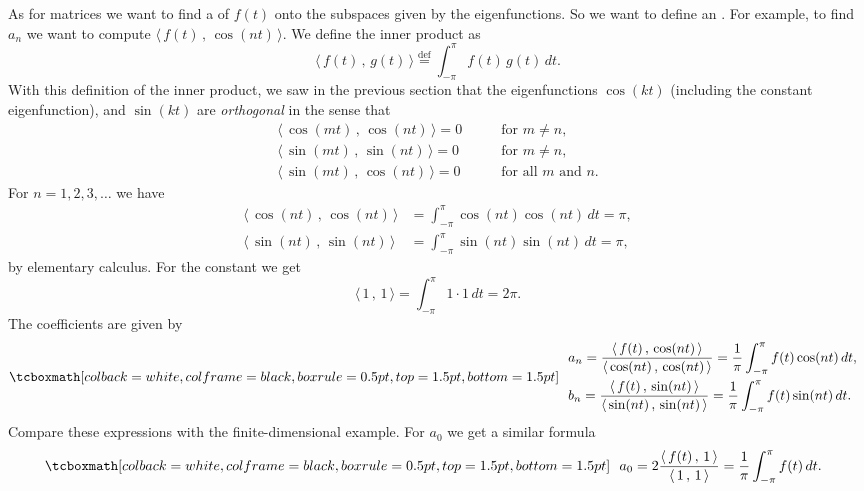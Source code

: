 As for matrices we want to find a \emph{}
of $f(t)$ onto the subspaces given by the eigenfunctions.  So we want to
define an \emph{}.  For example, to
find $a_n$ we want to compute $\langle \, f(t) \, , \, \cos (nt) \, \rangle$.
We define the inner product as
\begin{equation*}
\langle \, f(t)\, , \, g(t) \, \rangle \overset{\text{def}}{=}
\int_{-\pi}^\pi f(t) \, g(t) \, dt .
\end{equation*}
With this definition of the inner product,
we saw in the previous section that the eigenfunctions $\cos (kt)$
(including the constant eigenfunction), and
$\sin (kt)$ are \emph{orthogonal} in the sense
that
\begin{align*}
\langle \, \cos (mt)\, , \, \cos (nt) \, \rangle = 0 & \qquad \text{for } m \not= n , \\
\langle \, \sin (mt)\, , \, \sin (nt) \, \rangle = 0 & \qquad \text{for } m \not= n , \\
\langle \, \sin (mt)\, , \, \cos (nt) \, \rangle = 0 & \qquad \text{for all } m \text{ and } n .
\end{align*}
For $n=1,2,3,\ldots$
we have
\begin{align*}
\langle \, \cos (nt) \, , \, \cos (nt) \, \rangle &=
\int_{-\pi}^\pi \cos(nt)\cos(nt) \, dt
=
\pi,
\\
\langle \, \sin (nt) \, , \, \sin (nt) \, \rangle &=
\int_{-\pi}^\pi \sin(nt)\sin(nt) \, dt
=
\pi,
\end{align*}
by elementary calculus.  For the constant we get
\begin{equation*}
\langle \, 1 \, , \, 1 \, \rangle
=
\int_{-\pi}^\pi 1 \cdot 1 \, dt
 = 2\pi.
\end{equation*}
The coefficients are given by
\begin{equation*}
\mybxbg{~~
\begin{aligned}
& a_n =
\frac{\langle \, f(t) \, , \, \cos (nt) \, \rangle}{\langle \, \cos (nt) \, , \,
\cos (nt) \, \rangle}
= 
\frac{1}{\pi} \int_{-\pi}^\pi f(t) \cos (nt) \, dt , \\
& b_n =
\frac{\langle \, f(t) \, , \, \sin (nt) \, \rangle}{\langle \, \sin (nt) \, , \,
\sin (nt) \, \rangle}
= 
\frac{1}{\pi} \int_{-\pi}^\pi f(t) \sin (nt) \, dt .
\end{aligned}
~~}
\end{equation*}
Compare these expressions with the finite-dimensional example.
For $a_0$ we get a similar formula
\begin{equation*}
\mybxbg{~~
a_0 = 2
\frac{\langle \, f(t) \, , \, 1 \, \rangle}{\langle \, 1 \, , \,
1 \, \rangle}
=
\frac{1}{\pi} \int_{-\pi}^\pi f(t) \, dt .
~~}
\end{equation*}

